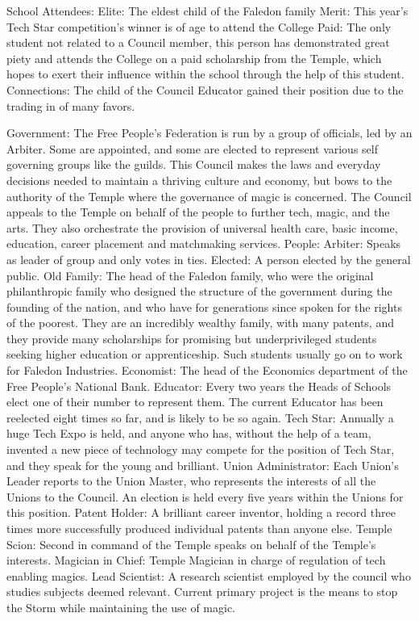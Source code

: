 \documentclass[blue]{GL2020}
\begin{document}
School Attendees:
	Elite: The eldest child of the Faledon family
	Merit: This year's Tech Star competition's winner is of age to attend the College
	Paid: The only student not related to a Council member, this person has demonstrated great piety and
		attends the College on a paid scholarship from the Temple, which hopes to exert their influence 
		within the school through the help of this student.
	Connections: The child of the Council Educator gained their position due to the trading in of many favors.

Government:  The Free People's Federation is run by a group of officials, led by an Arbiter. Some are appointed, and some are elected to represent various self governing groups like the guilds.  This Council makes the laws and everyday decisions needed to maintain a thriving culture and economy, but bows to the authority of the Temple where the governance of magic is concerned.  The Council appeals to the Temple on behalf of the people to further tech, magic, and the arts.  They also orchestrate the provision of universal health care, basic income, education, career placement and matchmaking services.
	People:		Arbiter:	Speaks as leader of group and only votes in ties.
						Elected:	A person elected by the general public. 
						Old Family:	The head of the Faledon family, who were the original philanthropic family who designed the structure of the government during the founding of the nation, and who have for generations since spoken for the rights of the poorest.  They are an incredibly wealthy family, with many patents, and they provide many scholarships for promising but underprivileged students seeking higher education or apprenticeship.  Such students usually go on to work for Faledon Industries.
						Economist:	The head of the Economics department of the Free People's National Bank.
						Educator:		Every two years the Heads of Schools elect one of their number to represent them.  The current Educator has been reelected eight times so far, and is likely to be so again.
						Tech Star:	Annually a huge Tech Expo is held, and anyone who has, without the help of a team, invented a new piece of technology may compete for the position of Tech Star, and they speak for the young and brilliant.
						Union Administrator:	Each Union's Leader reports to the Union Master, who represents the interests 
							of all the Unions to the Council.  An election is held every five years within the Unions for this
							position.
						Patent Holder:	A brilliant career inventor, holding a record three times more successfully produced
							individual patents than anyone else.
						Temple Scion:  Second in command of the Temple speaks on behalf of the Temple's interests.
						Magician in Chief:  Temple Magician in charge of regulation of tech enabling magics.
						Lead Scientist:  A research scientist employed by the council who studies subjects deemed relevant.  Current primary project is the means to stop the Storm while maintaining the use of magic.
	
\end{document}
